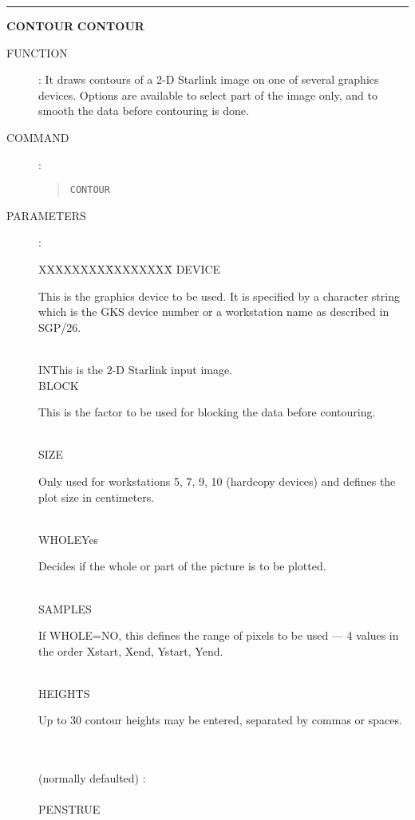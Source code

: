 \goodbreak
\rule{\textwidth}{0.3mm}
{\Large {\bf CONTOUR} \hfill {\bf CONTOUR}}
\begin{description}
\item [FUNCTION]:
It draws contours of a 2-D Starlink image on one of several graphics devices.
Options are available to select part of the image only, and to smooth the data
before contouring is done.
\item [COMMAND]:
\begin{quote}
{\tt CONTOUR}
\end{quote}
\item [PARAMETERS] :
\begin{tabbing}
XXXXXXXX\=XXXXXXXX\=\kill
DEVICE\>\>\begin{minipage}[t]{100mm}
This is the graphics device to be used.
It is specified by a character string which is the GKS device number or a
workstation name as described in SGP/26.
\end{minipage}\\
IN\>\>This is the 2-D Starlink input image.\\
BLOCK\>\begin{minipage}[t]{100mm}
This is the factor to be used for blocking the data before contouring.
\end{minipage}\\
SIZE\>\>\begin{minipage}[t]{100mm}
Only used for workstations 5, 7, 9, 10 (hardcopy devices) and defines the plot
size in centimeters.
\end{minipage}\\
WHOLE\>Yes\>\begin{minipage}[t]{100mm}
Decides if the whole or part of the picture is to be plotted.
\end{minipage}\\
SAMPLES\>\>\begin{minipage}[t]{100mm}
If WHOLE=NO, this defines the range of pixels to be used --- 4 values in the
order Xstart, Xend, Ystart, Yend.
\end{minipage}\\
HEIGHTS\>\>\begin{minipage}[t]{100mm}
Up to 30 contour heights may be entered, separated by commas or spaces.
\end{minipage}\\
\\
(normally defaulted) :\\
\\
PENS\>TRUE\>\begin{minipage}[t]{100mm}

\end{minipage}
\end{tabbing}
\end{description}
